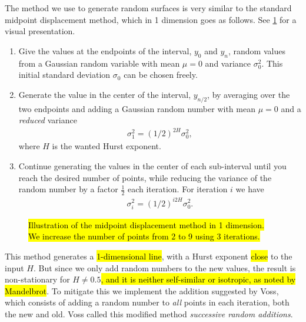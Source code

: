The method we use to generate random surfaces is very similar to the standard midpoint displacement method, which in 1 dimension goes as follows. See \cref{fig:midpoint01} for a visual presentation.
%
\begin{enumerate}
    \item Give the values at the endpoints of the interval, $y_0$ and $y_n$, random values from a Gaussian random variable with mean $\mu = 0$ and variance $\sigma_0^2$. This initial standard deviation $\sigma_0$ can be chosen freely.
    \item Generate the value in the center of the interval, $y_{n/2}$, by averaging over the two endpoints and adding a Gaussian random number with mean $\mu = 0$ and a \emph{reduced} variance
    \begin{align}
         \sigma_1^2 = \left(1/2\right)^{2H}\sigma_0^2, \label{eq:midpoint_sigma_first}
    \end{align}
    where $H$ is the wanted Hurst exponent.
    \item Continue generating the values in the center of each sub-interval until you reach the desired number of points, while reducing the variance of the random number by a factor $\frac{1}{2}$ each iteration. For iteration $i$ we have
    \begin{align}
        \sigma_i^2 = \left(1/2\right)^{i2H}\sigma_0^2. \label{eq:midpoint_sigma_general}
    \end{align}
\end{enumerate}
%
\begin{figure}[htpb]%
    \centering%
    \caption{%
        \hl{Illustration of the midpoint displacement method in 1 dimension. We increase the number of points from 2 to 9 using 3 iterations.}%
        \label{fig:midpoint01}%
    }%
\end{figure}%

This method generates a \hl{1-dimensional line}, with a Hurst exponent \hl{close} to the input $H$. But since we only add random numbers to the new values, the result is non-stationary for $H \neq 0.5$\cite{voss1985random}\hl{, and it is neither self-similar or isotropic, as noted by Mandelbrot}\cite{mandelbrot1982comment}. To mitigate this we implement the addition suggested by Voss\cite{voss1985random}, which consists of adding a random number to \emph{all} points in each iteration, both the new and old. Voss called this modified method \emph{successive random additions}.

